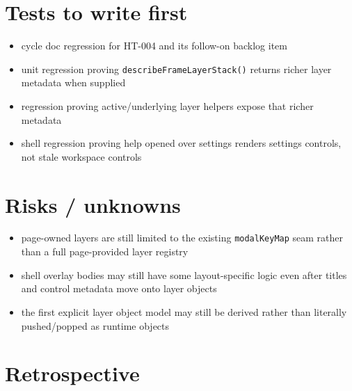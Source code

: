 \section{Tests to write first}\label{record-256-tests-to-write-first}

\begin{itemize}
\tightlist
\item
  cycle doc regression for HT-004 and its follow-on backlog item
\item
  unit regression proving \texttt{d\allowbreak{}e\allowbreak{}s\allowbreak{}c\allowbreak{}r\allowbreak{}i\allowbreak{}b\allowbreak{}e\allowbreak{}F\allowbreak{}r\allowbreak{}a\allowbreak{}m\allowbreak{}e\allowbreak{}L\allowbreak{}a\allowbreak{}y\allowbreak{}e\allowbreak{}r\allowbreak{}S\allowbreak{}t\allowbreak{}a\allowbreak{}c\allowbreak{}k\allowbreak{}(\allowbreak{})} returns richer layer metadata when supplied
\item
  regression proving active/underlying layer helpers expose that richer metadata
\item
  shell regression proving help opened over settings renders settings controls, not stale workspace controls
\end{itemize}

\section{Risks / unknowns}\label{record-256-risks-unknowns}

\begin{itemize}
\tightlist
\item
  page-owned layers are still limited to the existing \texttt{m\allowbreak{}o\allowbreak{}d\allowbreak{}a\allowbreak{}l\allowbreak{}K\allowbreak{}e\allowbreak{}y\allowbreak{}M\allowbreak{}a\allowbreak{}p} seam rather than a full page-provided layer registry
\item
  shell overlay bodies may still have some layout-specific logic even after titles and control metadata move onto layer objects
\item
  the first explicit layer object model may still be derived rather than literally pushed/popped as runtime objects
\end{itemize}

\section{Retrospective}\label{record-256-retrospective}

